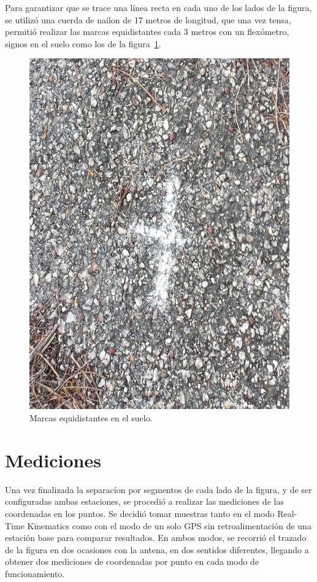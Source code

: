 Para garantizar que se trace una línea recta en cada uno de los lados de la figura, se utilizó una cuerda de nailon de 17 metros de longitud, que una vez tensa, permitió realizar las marcas equidistantes cada 3 metros con un flexómetro, signos en el suelo como los de la figura~\ref{fig:MarEq}.

\begin{figure}[H]
\centering
\includegraphics[scale=0.5]{Figures/Equid}
\caption[Marcas equidistantes en el suelo.]{Marcas equidistantes en el suelo.}
\label{fig:MarEq}
\end{figure}

\section{Mediciones}
Una vez finalizada la separacíon por segmentos de cada lado de la figura, y de ser configuradas ambas estaciones, se procedió a realizar las mediciones de las coordenadas en los puntos. Se decidió tomar muestras tanto en el modo Real-Time Kinematics como con el modo de un solo GPS sin retroalimentación de una estación base para comparar resultados. En ambos modos, se recorrió el trazado de la figura en dos ocasiones con la antena, en dos sentidos diferentes, llegando a obtener dos mediciones de coordenadas por punto en cada modo de funcionamiento.\\

